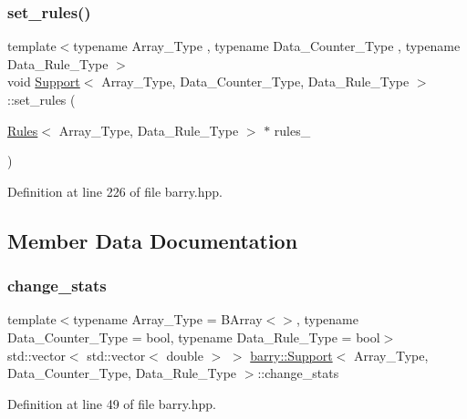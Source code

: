 \subsubsection{\texorpdfstring{set\+\_\+rules()}{set\_rules()}}
{\footnotesize\ttfamily template$<$typename Array\+\_\+\+Type , typename Data\+\_\+\+Counter\+\_\+\+Type , typename Data\+\_\+\+Rule\+\_\+\+Type $>$ \\
void \hyperlink{classbarry_1_1_support}{Support}$<$ Array\+\_\+\+Type, Data\+\_\+\+Counter\+\_\+\+Type, Data\+\_\+\+Rule\+\_\+\+Type $>$\+::set\+\_\+rules (\begin{DoxyParamCaption}\item[{\hyperlink{classbarry_1_1_rules}{Rules}$<$ Array\+\_\+\+Type, Data\+\_\+\+Rule\+\_\+\+Type $>$ $\ast$}]{rules\+\_\+ }\end{DoxyParamCaption})\hspace{0.3cm}{\ttfamily [inline]}}



Definition at line 226 of file barry.\+hpp.



\subsection{Member Data Documentation}
\mbox{\label{classbarry_1_1_support_a37c139514065d10807cd574ca748744b}} 
\subsubsection{\texorpdfstring{change\+\_\+stats}{change\_stats}}
{\footnotesize\ttfamily template$<$typename Array\+\_\+\+Type  = B\+Array$<$$>$, typename Data\+\_\+\+Counter\+\_\+\+Type  = bool, typename Data\+\_\+\+Rule\+\_\+\+Type  = bool$>$ \\
std\+::vector$<$ std\+::vector$<$ double $>$ $>$ \hyperlink{classbarry_1_1_support}{barry\+::\+Support}$<$ Array\+\_\+\+Type, Data\+\_\+\+Counter\+\_\+\+Type, Data\+\_\+\+Rule\+\_\+\+Type $>$\+::change\+\_\+stats}



Definition at line 49 of file barry.\+hpp.

\mbox{\label{classbarry_1_1_support_aa235837435a5ed7ac540481676333b88}} 
